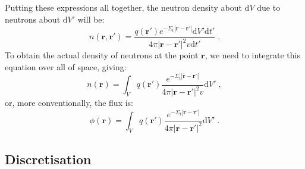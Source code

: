 Putting these expressions all together, the neutron density about $\mathrm{d}V$ due to neutrons about $\mathrm{d}V'$ will be:
\begin{equation*}
    n(\mathbf{r},\mathbf{r}') = \frac{q(\mathbf{r}')e^{-\Sigma_\mathrm{t}|\mathbf{r}-\mathbf{r}'|}\mathrm{d}V'\mathrm{d}t'}{4\pi|\mathbf{r}-\mathbf{r}'|^2v\mathrm{d}t'}\;\mathrm{.}
\end{equation*}
To obtain the actual density of neutrons at the point $\mathbf{r}$, we need to integrate this equation over all of space, giving:
\begin{equation*}
    n(\mathbf{r}) = \int_V q(\mathbf{r}') \frac{e^{-\Sigma_\mathrm{t}|\mathbf{r}-\mathbf{r}'|}}{4\pi|\mathbf{r}-\mathbf{r}'|^2v}\mathrm{d}V'\;\mathrm{,}
\end{equation*}
or, more conventionally, the flux is:
\begin{equation}\label{eq:integral}
    \phi(\mathbf{r}) = \int_V q(\mathbf{r}') \frac{e^{-\Sigma_\mathrm{t}|\mathbf{r}-\mathbf{r}'|}}{4\pi|\mathbf{r}-\mathbf{r}'|^2}\mathrm{d}V'\;\mathrm{.}
\end{equation}

\subsection{Discretisation}

